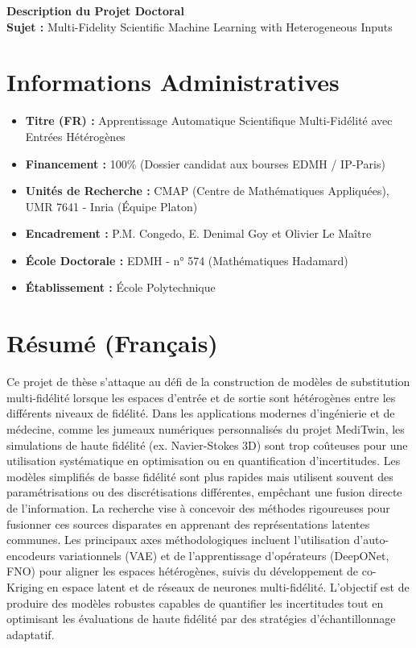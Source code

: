 \documentclass[a4paper,11pt]{article}
\begin{document}
\begin{center}
    {\Large\bfseries Description du Projet Doctoral}\\[10pt]
    \textbf{Sujet :} Multi-Fidelity Scientific Machine Learning with Heterogeneous Inputs
\end{center}

\section*{Informations Administratives}
\begin{itemize}[label=--]
    \item \textbf{Titre (FR) :} Apprentissage Automatique Scientifique Multi-Fidélité avec Entrées Hétérogènes
    \item \textbf{Financement :} 100\% (Dossier candidat aux bourses EDMH / IP-Paris)
    \item \textbf{Unités de Recherche :} CMAP (Centre de Mathématiques Appliquées), UMR 7641 - Inria (Équipe Platon)
    \item \textbf{Encadrement :} P.M. Congedo, E. Denimal Goy et Olivier Le Maître
    \item \textbf{École Doctorale :} EDMH - n° 574 (Mathématiques Hadamard)
    \item \textbf{Établissement :} École Polytechnique
\end{itemize}

\section*{Résumé (Français)}
Ce projet de thèse s'attaque au défi de la construction de modèles de substitution multi-fidélité lorsque les espaces d'entrée et de sortie sont hétérogènes entre les différents niveaux de fidélité. Dans les applications modernes d'ingénierie et de médecine, comme les jumeaux numériques personnalisés du projet MediTwin, les simulations de haute fidélité (ex. Navier-Stokes 3D) sont trop coûteuses pour une utilisation systématique en optimisation ou en quantification d'incertitudes. Les modèles simplifiés de basse fidélité sont plus rapides mais utilisent souvent des paramétrisations ou des discrétisations différentes, empêchant une fusion directe de l'information. La recherche vise à concevoir des méthodes rigoureuses pour fusionner ces sources disparates en apprenant des représentations latentes communes. Les principaux axes méthodologiques incluent l'utilisation d'auto-encodeurs variationnels (VAE) et de l'apprentissage d'opérateurs (DeepONet, FNO) pour aligner les espaces hétérogènes, suivis du développement de co-Kriging en espace latent et de réseaux de neurones multi-fidélité. L'objectif est de produire des modèles robustes capables de quantifier les incertitudes tout en optimisant les évaluations de haute fidélité par des stratégies d'échantillonnage adaptatif.
\end{document}
